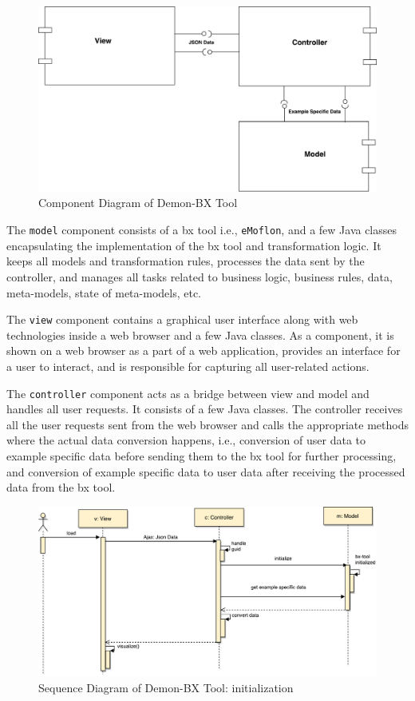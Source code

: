 \begin{figure}[h]
	\centering
	\includegraphics[width=1\textwidth]{figures/Component_Diagram-HighLevel}
	\caption{Component Diagram of Demon-BX Tool}
	\label{fig:Component_Diagram}
\end{figure}

The \texttt{model} component consists of a bx tool i.e., \texttt{eMoflon}, and a few Java classes encapsulating the implementation of the bx tool and transformation logic. It keeps all models and transformation rules, processes the data sent by the controller, and manages all tasks related to business logic, business rules, data, meta-models, state of meta-models, etc.

The \texttt{view} component contains a graphical user interface along with web technologies inside a web browser and a few Java classes. As a component, it is shown on a web browser as a part of a web application, provides an interface for a user to interact, and is responsible for capturing all user-related actions.

The \texttt{controller} component acts as a bridge between view and model and handles all user requests. It consists of a few Java classes. The controller receives all the user requests sent from the web browser and calls the appropriate methods where the actual data conversion happens, i.e., conversion of user data to example specific data before sending them to the bx tool for further processing, and conversion of example specific data to user data after receiving the processed data from the bx tool.

\begin{figure}
	\centering
	\includegraphics[width=1\textwidth]{figures/Sequence_Diagram-HighLevel(init)}
	\caption{Sequence Diagram of Demon-BX Tool: initialization}
	\label{fig:Sequence_Diagram-HighLevel(init)}
\end{figure}

